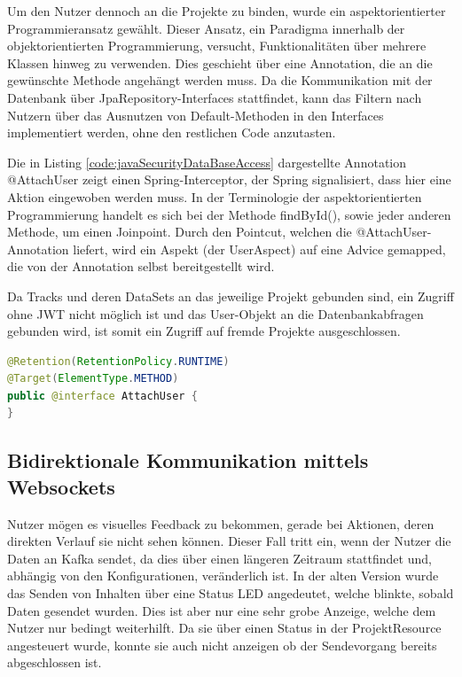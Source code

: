 Um den Nutzer dennoch an die Projekte zu binden, wurde ein aspektorientierter Programmieransatz gewählt. Dieser Ansatz, ein Paradigma innerhalb der objektorientierten Programmierung, versucht, Funktionalitäten über mehrere Klassen hinweg zu verwenden. Dies geschieht über eine Annotation, die an die gewünschte Methode angehängt werden muss. Da die Kommunikation mit der Datenbank über JpaRepository-Interfaces stattfindet, kann das Filtern nach Nutzern über das Ausnutzen von Default-Methoden in den Interfaces implementiert werden, ohne den restlichen Code anzutasten.

Die in Listing \ref*{code:javaSecurityDataBaseAccess} dargestellte Annotation @AttachUser zeigt einen Spring-Interceptor, der Spring signalisiert, dass hier eine Aktion eingewoben werden muss. In der Terminologie der aspektorientierten Programmierung handelt es sich bei der Methode findById(), sowie jeder anderen Methode, um einen Joinpoint. Durch den Pointcut, welchen die @AttachUser-Annotation liefert, wird ein Aspekt (der UserAspect) auf eine Advice gemapped, die von der Annotation selbst bereitgestellt wird.

Da Tracks und deren DataSets an das jeweilige Projekt gebunden sind, ein Zugriff ohne JWT nicht möglich ist und das User-Objekt an die Datenbankabfragen gebunden wird, ist somit ein Zugriff auf fremde Projekte ausgeschlossen.


\begin{lstlisting}[language=Java, caption={Annotation um einen Advice Annotation zu signalisieren}, label={code:javaSecurityDataBaseAccess}]
@Retention(RetentionPolicy.RUNTIME)
@Target(ElementType.METHOD)
public @interface AttachUser {
}
\end{lstlisting}


\subsection{Bidirektionale Kommunikation mittels Websockets}
\label{sec:javaWebsocket}

Nutzer mögen es visuelles Feedback zu bekommen, gerade bei Aktionen, deren direkten Verlauf sie nicht sehen können. 
Dieser Fall tritt ein, wenn der Nutzer die Daten an Kafka sendet, da dies über einen längeren Zeitraum stattfindet und, abhängig von den Konfigurationen, veränderlich ist.
In der alten Version wurde das Senden von Inhalten über eine Status LED angedeutet, welche blinkte, sobald Daten gesendet wurden. Dies ist aber nur eine sehr grobe Anzeige, welche dem Nutzer nur bedingt weiterhilft.
Da sie über einen Status in der ProjektResource angesteuert wurde, konnte sie auch nicht anzeigen ob der Sendevorgang bereits abgeschlossen ist.

